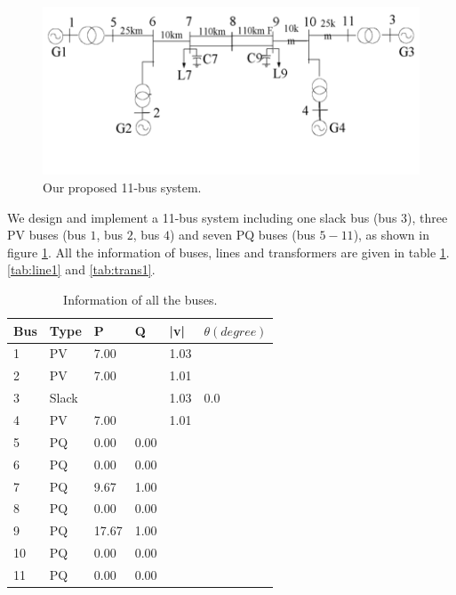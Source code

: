 \documentclass[conference]{IEEEtran}
\begin{document}
\begin{figure}[htbp]
	\centering
	\includegraphics[width=1.4\columnwidth, clip=true]{grid1.png}
	\vspace{-10mm}
	\caption{Our proposed 11-bus system.}
	\label{fig:grid1}
	\vspace{-3mm}
\end{figure}

We design and implement a 11-bus system including one slack bus (bus $3$), three PV buses (bus $1$, bus $2$, bus $4$) and seven PQ buses (bus $5-11$), as shown in figure \ref{fig:grid1}. All the information of buses, lines and transformers are given in table \ref{tab:bus1}. \ref{tab:line1} and \ref{tab:trans1}.

\begin{table}[]
	\begin{center}
		\begin{tabular}{|l|l|l|l|l|l|}
			\hline
			Bus & Type  & P     & Q    & |v|  & $\theta(degree)$ \\ \hline
			1   & PV    & 7.00  &      & 1.03 &     \\ \hline
			2   & PV    & 7.00  &      & 1.01 &     \\ \hline
			3   & Slack &       &      & 1.03 & 0.0 \\ \hline
			4   & PV    & 7.00  &      & 1.01 &     \\ \hline
			5   & PQ    & 0.00  & 0.00 &      &     \\ \hline
			6   & PQ    & 0.00  & 0.00 &      &     \\ \hline
			7   & PQ    & 9.67  & 1.00 &      &     \\ \hline
			8   & PQ    & 0.00  & 0.00 &      &     \\ \hline
			9   & PQ    & 17.67 & 1.00 &      &     \\ \hline
			10  & PQ    & 0.00  & 0.00 &      &     \\ \hline
			11  & PQ    & 0.00  & 0.00 &      &     \\ \hline
		\end{tabular}
	\end{center}
	\caption{Information of all the buses.}
	\vspace{-3mm}
	\label{tab:bus1}
\end{table}
\end{document}
